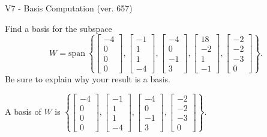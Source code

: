 \begin{exercise}
  \begin{exerciseTitle}V7 - Basis Computation (ver. 657)\end{exerciseTitle}
  \begin{exerciseStatement}
    Find a basis for the subspace 
\[W=\mathrm{span}\ \left\{\left[\begin{array}{r}
-4 \\
0 \\
0 \\
0
\end{array}\right] , \left[\begin{array}{r}
-1 \\
1 \\
1 \\
-4
\end{array}\right] , \left[\begin{array}{r}
-4 \\
0 \\
-1 \\
3
\end{array}\right] , \left[\begin{array}{r}
18 \\
-2 \\
1 \\
-1
\end{array}\right] , \left[\begin{array}{r}
-2 \\
-2 \\
-3 \\
0
\end{array}\right]\right\}.\]
 Be sure to explain why your result is a basis.


  \end{exerciseStatement}
  \begin{exerciseAnswer}
   A basis of \(W\) is  \(\left\{\left[\begin{array}{r}
-4 \\
0 \\
0 \\
0
\end{array}\right] , \left[\begin{array}{r}
-1 \\
1 \\
1 \\
-4
\end{array}\right] , \left[\begin{array}{r}
-4 \\
0 \\
-1 \\
3
\end{array}\right] , \left[\begin{array}{r}
-2 \\
-2 \\
-3 \\
0
\end{array}\right]\right\}\).
  


  \end{exerciseAnswer}
\end{exercise}